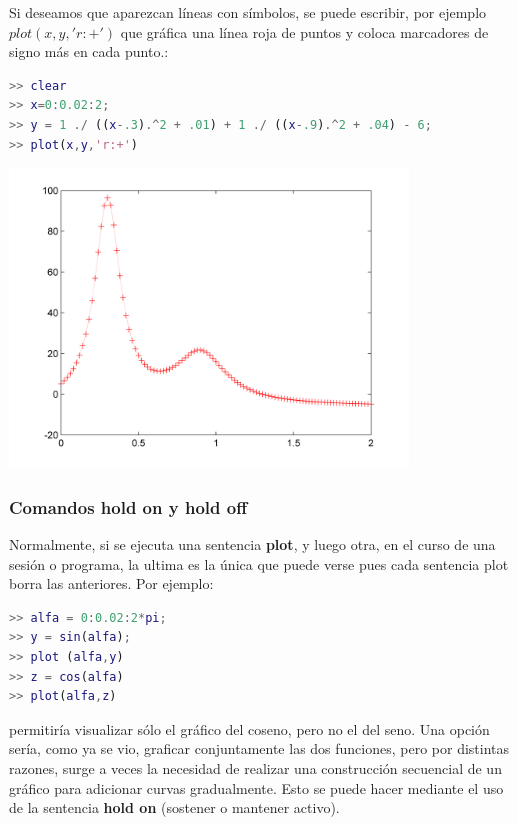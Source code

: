 Si deseamos que aparezcan líneas con símbolos, se puede escribir, por ejemplo $plot(x,y,'r:+')$ 
que gráfica una línea roja de puntos y coloca marcadores de signo más en cada punto.:

\begin{lstlisting}[language=Matlab]
>> clear 
>> x=0:0.02:2; 
>> y = 1 ./ ((x-.3).^2 + .01) + 1 ./ ((x-.9).^2 + .04) - 6;
>> plot(x,y,'r:+')
\end{lstlisting}
\begin{center}
\includegraphics[width=300pt]{./Imagenes/simbolo2.png}
\end{center}

\subsubsection{Comandos hold on y hold off}

Normalmente, si se ejecuta una sentencia \textbf{plot}, y luego otra, en el curso de una sesión o 
programa, la ultima es la única que puede verse pues cada sentencia plot borra las anteriores. 
Por ejemplo:

\begin{lstlisting}[language=Matlab]
>> alfa = 0:0.02:2*pi; 
>> y = sin(alfa); 
>> plot (alfa,y) 
>> z = cos(alfa) 
>> plot(alfa,z)
\end{lstlisting}
 
permitiría visualizar sólo el gráfico del coseno, pero no el del seno. Una opción sería, como ya se vio, graficar conjuntamente las dos funciones, pero por distintas razones, surge a veces la necesidad de realizar una construcción secuencial de un gráfico para adicionar curvas 
gradualmente.  Esto se puede hacer mediante el uso de la sentencia \textbf{hold on} (sostener o mantener activo).

